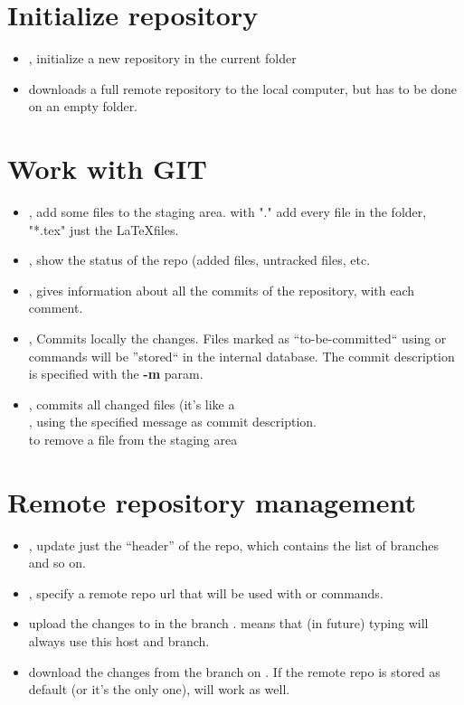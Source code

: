 \section{Initialize repository}
\begin{itemize}
\item {}, initialize a new repository in the current folder 
\item {} downloads a full remote repository to the local computer, but has to be done on an empty folder.
\end{itemize}

\section{Work with GIT}
\begin{itemize}
\item {}, add some files to the staging area.  with "." add every file in the folder, "*.tex" just the \LaTeX  files.
\item {}, show the status of the repo (added files, untracked files, etc.
\item {}, gives information about all the commits of the repository, with each comment.
\item {}, Commits locally the changes. Files marked as ``to-be-committed`` using  or  commands will be ''stored`` in the internal database. The commit description is specified with the \textbf{-m} param.
\item {}, commits all changed files (it's like a \\ , using the specified message as commit description.
\\  to remove a file from the staging area 
\end{itemize}

\section{Remote repository management}
\begin{itemize}
\item {}, update just the ``header'' of the repo, which contains the list of branches and so on.
\item {}, specify a remote repo url that will be used with  or  commands. 
\item {} upload the changes to  in the branch .  means that (in future) typing  will always use this host and branch.
\item {} download the changes from the branch  on . If the remote repo is stored as default (or it's the only one),  will work as well.
\end {itemize}

